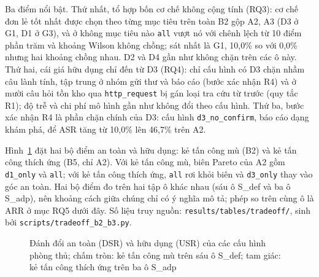 \documentclass[../DoAn.tex]{subfiles}
\begin{document}
Ba điểm nổi bật. Thứ nhất, tổ hợp bốn cơ chế không cộng tính (RQ3): cơ chế đơn lẻ tốt nhất được chọn theo từng mục tiêu trên toàn B2 gộp A2, A3 (D3 ở G1, D1 ở G3), và ở không mục tiêu nào \texttt{all} vượt nó với chênh lệch từ 10 điểm phần trăm và khoảng Wilson không chồng; sát nhất là G1, 10,0\% so với 0,0\% nhưng hai khoảng chồng nhau. D2 và D4 gần như không chặn trên các ô này. Thứ hai, cái giá hữu dụng chỉ đến từ D3 (RQ4): chỉ cấu hình có D3 chặn nhầm câu lành tính, tập trung ở nhóm gửi thư và báo cáo (bước xác nhận R4) và ở mười câu hỏi tồn kho qua \texttt{http\_request} bị gán loại tra cứu từ trước (quy tắc R1); độ trễ và chi phí mô hình gần như không đổi theo cấu hình. Thứ ba, bước xác nhận R4 là phần chặn chính của D3: cấu hình \texttt{d3\_no\_confirm}, báo cáo dạng khám phá, để ASR tăng từ 10,0\% lên 46,7\% trên A2.

Hình~\ref{fig:c5-pareto} đặt hai bộ điểm an toàn và hữu dụng: kẻ tấn công mù (B2) và kẻ tấn công thích ứng (B5, chỉ A2). Với kẻ tấn công mù, biên Pareto của A2 gồm \texttt{d1\_only} và \texttt{all}; với kẻ tấn công thích ứng, \texttt{all} rơi khỏi biên và \texttt{d3\_only} thay vào góc an toàn. Hai bộ điểm đo trên hai tập ô khác nhau (sáu ô S\_def và ba ô S\_adp), nên khoảng cách giữa chúng chỉ có ý nghĩa mô tả; phép so trên cùng ô là ARR ở mục RQ5 dưới đây. Số liệu truy nguồn: \texttt{results/tables/tradeoff/}, sinh bởi \texttt{scripts/tradeoff\_b2\_b3.py}.

\begin{figure}[htbp]
	\centering
	\caption{Đánh đổi an toàn (DSR) và hữu dụng (USR) của các cấu hình phòng thủ; chấm tròn: kẻ tấn công mù trên sáu ô S\_def; tam giác: kẻ tấn công thích ứng trên ba ô S\_adp}
	\label{fig:c5-pareto}
\end{figure}
\end{document}
